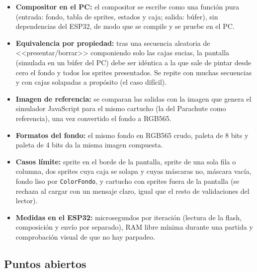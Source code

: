 \begin{itemize}
	\item \textbf{Compositor en el PC:} el compositor se escribe como una función pura (entrada: fondo, tabla de sprites, estados y caja; salida: búfer), sin dependencias del ESP32, de modo que se compile y se pruebe en el PC.
	\item \textbf{Equivalencia por propiedad:} tras una secuencia aleatoria de <<presentar/borrar>> componiendo solo las cajas sucias, la pantalla (simulada en un búfer del PC) debe ser idéntica a la que sale de pintar desde cero el fondo y todos los sprites presentados. Se repite con muchas secuencias y con cajas solapadas a propósito (el caso difícil).
	\item \textbf{Imagen de referencia:} se comparan las salidas con la imagen que genera el simulador JavaScript para el mismo cartucho (la del Parachute como referencia), una vez convertido el fondo a RGB565.
	\item \textbf{Formatos del fondo:} el mismo fondo en RGB565 crudo, paleta de 8 bits y paleta de 4 bits da la misma imagen compuesta.
	\item \textbf{Casos límite:} sprite en el borde de la pantalla, sprite de una sola fila o columna, dos sprites cuya caja se solapa y cuyas máscaras no, máscara vacía, fondo liso por \texttt{ColorFondo}, y cartucho con sprites fuera de la pantalla (se rechaza al cargar con un mensaje claro, igual que el resto de validaciones del lector).
	\item \textbf{Medidas en el ESP32:} microsegundos por iteración (lectura de la flash, composición y envío por separado), RAM libre mínima durante una partida y comprobación visual de que no hay parpadeo.
\end{itemize}

\subsection{Puntos abiertos}
\label{sec:F6I01Abiertos}

